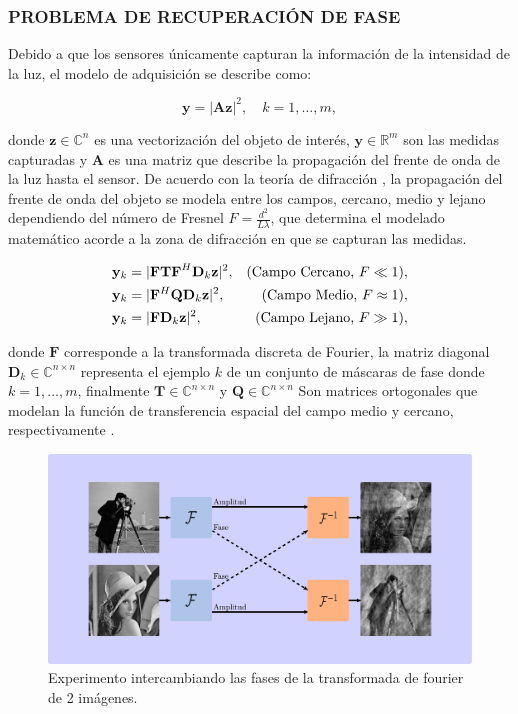 \subsubsection{PROBLEMA DE RECUPERACIÓN DE FASE}

Debido a que los sensores únicamente capturan la información de la intensidad de la luz, el modelo de adquisición se describe como:

\begin{equation}
    \mathbf{y} = \vert \mathbf{A}\mathbf{z} \vert^2, \quad k=1,\dots, m, 
    \label{eq:phase_retrieval_problem}
\end{equation}

donde $\mathbf{z} \in {\mathbb{C}}^{n}$ es una vectorización del objeto de interés, $\mathbf{y} \in \mathbb{R}^{m}$ son las medidas capturadas y $\mathbf{A}$ es una matriz que describe la propagación del frente de onda de la luz hasta el sensor. De acuerdo con la teoría de difracción \cite{poon2014introduction}, la propagación del frente de onda del objeto se modela entre los campos, cercano, medio y lejano dependiendo del número de Fresnel $F = \frac{d^2}{L\lambda}$, que determina el modelado matemático acorde a la zona de difracción en que se capturan las medidas.

\begin{align}
    \mathbf{y}_k &= \vert \mathbf{FTF}^{H}\mathbf{D}_k\mathbf{z} \vert^2, & \hfill (\text{Campo Cercano, }F \ll 1) \nonumber, \\ 
    \mathbf{y}_k &= \vert \mathbf{F}^{H}\mathbf{Q}\mathbf{D}_k\mathbf{z} \vert^2,  & \hfill (\text{Campo Medio, }F \approx 1), \\
    \mathbf{y}_k &= \vert \mathbf{F}\mathbf{D}_k\mathbf{z} \vert^2,  & \hfill (\text{Campo Lejano, } F \gg 1),   \nonumber
    \label{eq:modelado_zonas_difraccion}
\end{align}

donde $\mathbf{F}$ corresponde a la transformada discreta de Fourier, la matriz diagonal $\mathbf{D}_k \in \mathbb{C}^{n \times n}$ representa el ejemplo $k$ de un conjunto de máscaras de fase donde $k=1,\dots,m$, finalmente $\mathbf{T} \in \mathbb{C}^{n \times n}$ y $\mathbf{Q} \in \mathbb{C}^{n \times n}$ Son matrices ortogonales que modelan la función de transferencia espacial del campo medio y cercano, respectivamente \cite{poon2014introduction,goodman2005introduction}.

\begin{figure}[H]
    \centering
    \includegraphics[width=0.8\linewidth]{images/mescla_abs_fase.pdf}
    \caption{Experimento intercambiando las fases de la transformada de fourier de 2 imágenes.}
    \label{fig:mescla_fases}
\end{figure}

